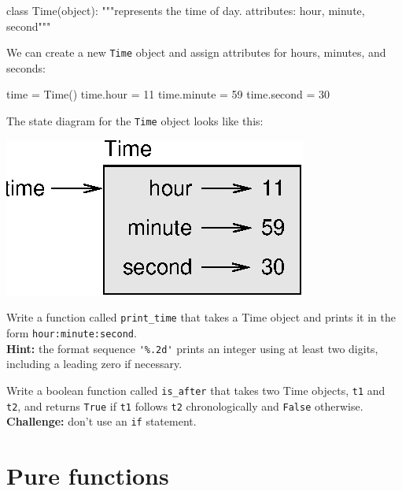 \beforeverb
\begin{pycode}
class Time(object):
    """represents the time of day.
       attributes: hour, minute, second"""
\end{pycode}
\afterverb
%
We can create a new {\tt Time} object and assign
attributes for hours, minutes, and seconds:

\beforeverb
\begin{pycode}
time = Time()
time.hour = 11
time.minute = 59
time.second = 30
\end{pycode}
\afterverb
%
The state diagram for the {\tt Time} object looks like this:


\beforefig
\centerline{\includegraphics{figs/time.eps}}
\afterfig

\begin{exercise}
\label{printtime}
Write a function called \verb"print_time" that takes a 
Time object and prints it in the form {\tt hour:minute:second}.\\

{\bf Hint:} the format sequence \verb"'%.2d'" prints an integer using
at least two digits, including a leading zero if necessary.
\end{exercise}

\begin{exercise}
\label{is_after}


Write a boolean function called \verb"is_after" that
takes two Time objects, {\tt t1} and {\tt t2}, and
returns {\tt True} if {\tt t1} follows {\tt t2} chronologically and
{\tt False} otherwise. \\

{\bf Challenge:} don't use an {\tt if} statement.
\end{exercise}


\section{Pure functions}


